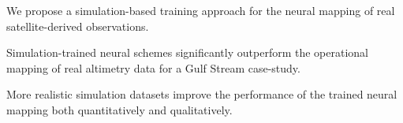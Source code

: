 \documentclass[draft]{agujournal2019}
\begin{document}


\begin{keypoints}
\item We propose a simulation-based training approach for the neural mapping of real satellite-derived observations.
\item Simulation-trained neural schemes significantly outperform the operational mapping of real altimetry data for a Gulf Stream case-study.
\item More realistic simulation datasets improve the performance of the trained neural mapping both quantitatively and qualitatively. 
\end{keypoints}

%
%

%
%
\end{document}
